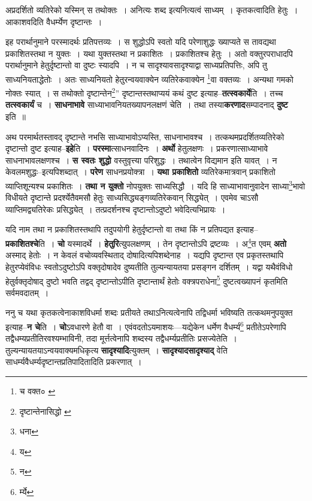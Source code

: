 \documentclass[article,12pt,a4paper]{memoir}
\begin{document}
	अप्रदर्शितो व्यतिरेको यस्मिन् स तथोक्तः । अनित्यः शब्द इत्यनित्यत्वं साध्यम् । कृतकत्वादिति हेतुः । आकाशवदिति वैधर्म्येण दृष्टान्तः । 
	  
	इह परार्थानुमाने परस्मादर्थः प्रतिपत्तव्यः । स शुद्धोऽपि स्वतो यदि परेणाशुद्धः ख्याप्यते स तावद्यथा प्रकाशितस्तथा न युक्तः । यथा युक्तस्तथा न प्रकाशितः । प्रकाशितश्च हेतुः । अतो वक्तुरपराधादपि परार्थानुमाने हेतुर्दृष्टान्तो वा दुष्टः स्यादपि । न च सादृश्यावसादृश्याद्वा साध्यप्रतिपत्तिः, अपि तु साध्यनियताद्धेतोः । अतः साध्यनियतो हेतुरन्वयवाक्येन व्यतिरेकवाक्येन \footnote{च वक्त० \cite{dp-msA} \cite{dp-msB} \cite{dp-edP} \cite{dp-edH} \cite{dp-edE} \cite{dp-edN}}\-वा वक्तव्यः । अन्यथा गमको नोक्तः स्यात् । स तथोक्तो दृष्टान्तेन\footnote{दृष्टान्तेनासिद्धो \cite{dp-msB}}” दृष्टान्तस्तथाप्ययं कथं दुष्ट इत्याह--\textbf{तत्स्वकार्ये}ति । तच्च \textbf{तत्स्वकार्यं} च । \textbf{साधनाभावे} साध्याभावनियतख्यापनलक्षणं चेति । तथा तस्या\textbf{करणाद}सम्पादनाद् \textbf{दुष्ट} इति ॥
	\pend
      

	  \pstart अथ परमार्थतस्तावद् दृष्टान्ते नभसि साध्याभावोऽप्यस्ति, साधनाभावश्च । तत्कथमप्रदर्शितव्यतिरेको दृष्टान्तो दुष्ट इत्याह--\textbf{इहे}ति । \textbf{परस्मा}त्साधनवादिनः । \textbf{अर्थो} हेतुलक्षणः । प्रकरणात्साध्याभावे साधनाभावलक्षणश्च । \textbf{स स्वतः शुद्धो} वस्तुवृत्त्या परिशुद्धः । तथात्वेन विद्यमान इति यावत् । न केवलमशुद्धः--इत्यपिशब्दात् । \textbf{परेण} साधनप्रयोक्त्रा । \textbf{यथा प्रकाशितो} व्यतिरेकमात्रवान् प्रकाशितो व्याप्तिशून्यश्च प्रकाशितः । \textbf{तथा न युक्तो} नोपयुक्तः साध्यसिद्धौ । यदि हि साध्याभावानुवादेन साध्या\footnote{धना}\-भावो विधीयते दृष्टान्ते प्रदर्श्येतैवमसौ हेतुः साध्यसिद्ध्यङ्गव्यतिरेकवान् सिद्ध्येत् । एवमेव चाऽसौ व्याप्तिमद्व्यतिरेकः प्रसिद्ध्येत् । तत्प्रदर्शनश्च दृष्टान्तोऽदुष्टो भवेदित्यभिप्रायः ।
	\pend
      

	  \pstart यदि नाम तथा न प्रकाशितस्तथापि तदुपयोगी हेतुर्दृष्टान्तो वा तथा किं न प्रतिपद्यत इत्याह--\textbf{प्रकाशितश्चे}ति । \textbf{चो} यस्मादर्थे । \textbf{हेतुरि}त्युपलक्षणम् । तेन दृष्टान्तोऽपि द्रष्टव्यः । अ\footnote{य}\-त एवम् \textbf{अतो} अस्माद् हेतोः । न केवलं वचोव्यवस्थिताद् दोषादित्यपिशब्देनाह । यद्यपि दृष्टान्त एव प्रकृतस्तथापि हेतुरप्येवंविधः स्वतोऽदुष्टोऽपि वक्तृदोषादेव दुष्यतीति तुल्यन्यायतया प्रसङ्गन दर्शितम् । यद्वा यथैवंविधो हेतुर्वक्तृदोषाद् दुष्टो भवति तद्वद् दृष्टान्तोऽपीति दृष्टान्तार्थं हेतोः वक्त्रपराधेना\footnote{न} दुष्टत्वख्यापनं कृतमिति सर्वमवदातम् ।
	\pend
      

	  \pstart \leavevmode{} ननु च यथा कृतकत्वेनाकाशविधर्मा शब्दः प्रतीयते तथाऽनित्यत्वेनापि तद्विधर्मा भविष्यति तत्कथमनुपयुक्त इत्याह--\textbf{न चे}ति । \textbf{चो}ऽवधारणे हेतौ वा । एवंवदतोऽयमाशयः—यद्येकेन धर्मेण वैधर्म्य\footnote{र्म्ये} प्रतीतेऽपरेणापि तद्वैधम्यप्रतीतिरवश्यम्भाविनी, तदा मूर्त्तत्वेनापि शब्दस्य तद्वैधर्म्यप्रतीतिः प्रसज्येतेति । तुल्यन्यायतयाऽन्वयवाक्यमधिकृत्य \textbf{सादृश्यादि}त्युक्तम् । \textbf{सादृश्यादसादृश्याद्} वेति साधर्म्यवैधर्म्यदृष्टान्तप्रतिपादितादिति प्रकरणात् ।
	\pend
      
\end{document}
